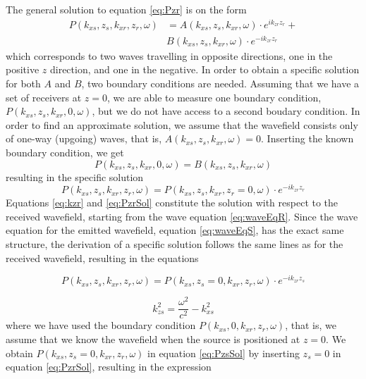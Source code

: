 \documentclass{article}%
\begin{document}
The general solution to equation \ref{eq:Pzr} is on the form
\begin{align}
	P(k_{xs},z_s,k_{xr},z_r,\omega) &= A(k_{xs},z_s,k_{xr},\omega) \cdot e^{i k_{zr} z_r} + \\
		& B(k_{xs},z_s,k_{xr},\omega) \cdot e^{-i k_{zr} z_r}
\label{eq:}
\end{align}
which corresponds to two waves travelling in opposite directions, one in the positive $z$ direction, and one in the negative. In order to obtain a specific solution for both $A$ and $B$, two boundary conditions are needed. Assuming that we have a set of receivers at $z=0$, we are able to measure one boundary condition, $P(k_{xs},z_s,k_{xr},0,\omega)$, but we do not have access to a second boudary condition. In order to find an approximate solution, we assume that the wavefield consists only of one-way (upgoing) waves, that is, $A(k_{xs},z_s,k_{xr},\omega) = 0$. Inserting the known boundary condition, we get
\begin{equation}
	P(k_{xs},z_s,k_{xr},0,\omega) = B(k_{xs},z_s,k_{xr},\omega) 
\label{eq:}
\end{equation}  
resulting in the specific solution 
\begin{equation}
	P(k_{xs},z_s,k_{xr},z_r,\omega) = P(k_{xs},z_s,k_{xr},z_r=0,\omega) \cdot e^{-i k_{zr} z_r}
\label{eq:PzrSol}
\end{equation}
Equations \ref{eq:kzr} and \ref{eq:PzrSol} constitute the solution with respect to the received wavefield, starting from the wave equation \ref{eq:waveEqR}. Since the wave equation for the emitted wavefield, equation \ref{eq:waveEqS}, has the exact same structure, the derivation of a specific solution follows the same lines as for the received wavefield, resulting in the equations

\begin{equation}
	P(k_{xs},z_s,k_{xr},z_r,\omega) = P(k_{xs},z_s=0,k_{xr},z_r,\omega) \cdot e^{-i k_{zr} z_s}
\label{eq:PzsSol}
\end{equation}

\begin{equation}
	k_{zs}^2 = \frac{\omega^2}{c^2} - k_{xs}^2
\label{eq:kzs}
\end{equation}
where we have used the boundary condition $P(k_{xs},0,k_{xr},z_r,\omega)$, that is, we assume that we know the wavefield when the source is positioned at $z=0$. We obtain $P(k_{xs},z_s=0,k_{xr},z_r,\omega)$ in equation \ref{eq:PzsSol} by inserting  $z_s = 0$ in equation \ref{eq:PzrSol}, resulting in the expression
\end{document}
